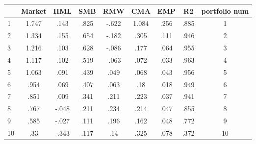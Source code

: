 {
\def\sym#1{\ifmmode^{#1}\else\(^{#1}\)\fi}
\begin{tabular}{l*{1}{cccccccc}}
\hline\hline
            &     Market &         HML&         SMB&         RMW&         CMA&         EMP&          R2&portfolio num\\
\hline
1           &       1.747&        .143&        .825&       -.622&       1.084&        .256&        .885&           1\\
2           &       1.334&        .155&        .654&       -.182&        .305&        .111&        .946&           2\\
3           &       1.216&        .103&        .628&       -.086&        .177&        .064&        .955&           3\\
4           &       1.117&        .102&        .519&       -.063&        .072&        .033&        .963&           4\\
5           &       1.063&        .091&        .439&        .049&        .068&        .043&        .956&           5\\
6           &        .954&        .069&        .407&        .063&         .18&        .018&        .949&           6\\
7           &        .851&        .009&        .341&        .211&        .223&        .037&        .941&           7\\
8           &        .767&       -.048&        .211&        .234&        .214&        .047&        .855&           8\\
9           &        .585&       -.027&        .111&        .196&        .162&        .048&        .772&           9\\
10          &         .33&       -.343&        .117&         .14&        .325&        .078&        .372&          10\\
\hline\hline
\end{tabular}
}
